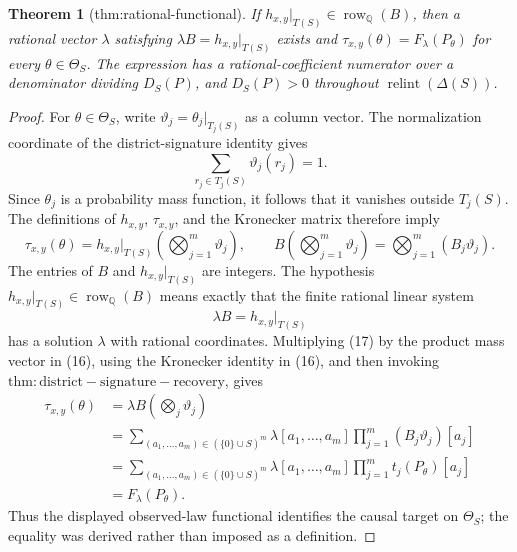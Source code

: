 \documentclass{article}
\newtheorem{theorem}{Theorem}
\begin{document}
\begin{theorem}[thm:rational-functional]\label{thm:rational-functional}
If \(h_{x,y}|_{T(S)}\in\operatorname{row}_{\mathbb Q}(B)\), then a rational vector \(\lambda\) satisfying \(\lambda B=h_{x,y}|_{T(S)}\) exists and \(\tau_{x,y}(\theta)=F_{\lambda}(P_{\theta})\) for every \(\theta\in\Theta_S\). The expression has a rational-coefficient numerator over a denominator dividing \(D_S(P)\), and \(D_S(P)>0\) throughout \(\operatorname{relint}(\Delta(S))\).
\end{theorem}
\begin{proof}
For \(\theta\in\Theta_S\), write \(\vartheta_j=\theta_j|_{T_j(S)}\) as a column vector.  The normalization coordinate of the district-signature identity gives
\[
\sum_{r_j\in T_j(S)}\vartheta_j(r_j)=1.
\]
Since \(\theta_j\) is a probability mass function, it follows that it vanishes outside \(T_j(S)\).  The definitions of \(h_{x,y}\), \(\tau_{x,y}\), and the Kronecker matrix therefore imply
\[
\tau_{x,y}(\theta)
=h_{x,y}|_{T(S)}\left(\bigotimes_{j=1}^m\vartheta_j\right),
\qquad
B\left(\bigotimes_{j=1}^m\vartheta_j\right)
=\bigotimes_{j=1}^m(B_j\vartheta_j).                          \tag{16}
\]
The entries of \(B\) and \(h_{x,y}|_{T(S)}\) are integers.  The hypothesis
\(h_{x,y}|_{T(S)}\in\operatorname{row}_{\mathbb Q}(B)\) means exactly that the finite rational linear system
\[
\lambda B=h_{x,y}|_{T(S)}                                    \tag{17}
\]
has a solution \(\lambda\) with rational coordinates.  Multiplying (17) by the product mass vector in (16), using the Kronecker identity in (16), and then invoking \(\mathrm{thm:district-signature-recovery}\), gives
\[
\begin{aligned}
\tau_{x,y}(\theta)
&=\lambda B\left(\bigotimes_j\vartheta_j\right)\\
&=\sum_{(a_1,\ldots,a_m)\in(\{0\}\cup S)^m}
  \lambda[a_1,\ldots,a_m]\prod_{j=1}^m(B_j\vartheta_j)[a_j]\\
&=\sum_{(a_1,\ldots,a_m)\in(\{0\}\cup S)^m}
  \lambda[a_1,\ldots,a_m]\prod_{j=1}^m t_j(P_\theta)[a_j]\\
&=F_\lambda(P_\theta).                                       \tag{18}
\end{aligned}
\]
Thus the displayed observed-law functional identifies the causal target on \(\Theta_S\); the equality was derived rather than imposed as a definition.


\end{proof}
\end{document}

